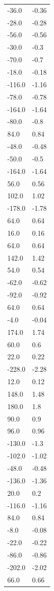 \begin{longtable}{ll}
-36.0 & -0.36 \\
-28.0 & -0.28 \\
-56.0 & -0.56 \\
-30.0 & -0.3 \\
-70.0 & -0.7 \\
-18.0 & -0.18 \\
-116.0 & -1.16 \\
-78.0 & -0.78 \\
-164.0 & -1.64 \\
-80.0 & -0.8 \\
84.0 & 0.84 \\
-48.0 & -0.48 \\
-50.0 & -0.5 \\
-164.0 & -1.64 \\
56.0 & 0.56 \\
102.0 & 1.02 \\
-178.0 & -1.78 \\
64.0 & 0.64 \\
16.0 & 0.16 \\
64.0 & 0.64 \\
142.0 & 1.42 \\
54.0 & 0.54 \\
-62.0 & -0.62 \\
-92.0 & -0.92 \\
64.0 & 0.64 \\
-4.0 & -0.04 \\
174.0 & 1.74 \\
60.0 & 0.6 \\
22.0 & 0.22 \\
-228.0 & -2.28 \\
12.0 & 0.12 \\
148.0 & 1.48 \\
180.0 & 1.8 \\
90.0 & 0.9 \\
96.0 & 0.96 \\
-130.0 & -1.3 \\
-102.0 & -1.02 \\
-48.0 & -0.48 \\
-136.0 & -1.36 \\
20.0 & 0.2 \\
-116.0 & -1.16 \\
84.0 & 0.84 \\
-8.0 & -0.08 \\
-22.0 & -0.22 \\
-86.0 & -0.86 \\
-202.0 & -2.02 \\
66.0 & 0.66 \\

\end{longtable}
